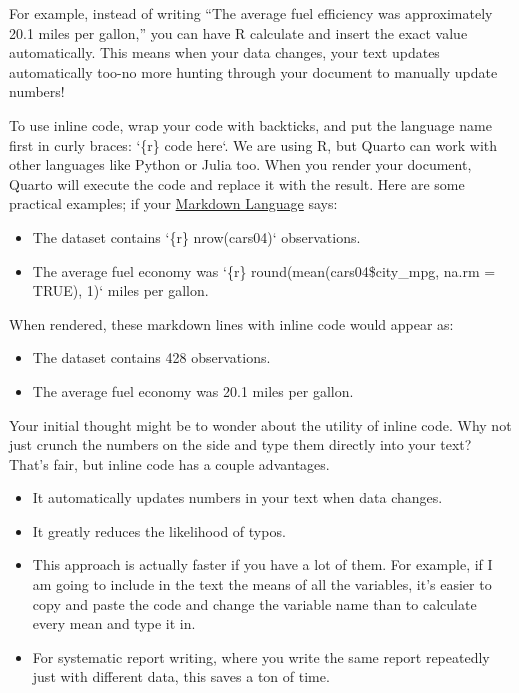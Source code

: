 \documentclass[
  letterpaper,
]{book}
\begin{document}
For example, instead of writing ``The average fuel efficiency was
approximately 20.1 miles per gallon,'' you can have R calculate and
insert the exact value automatically. This means when your data changes,
your text updates automatically too-no more hunting through your
document to manually update numbers!

To use inline code, wrap your code with backticks, and put the language
name first in curly braces: `\{r\} code here`. We are using R, but
Quarto can work with other languages like Python or Julia too. When you
render your document, Quarto will execute the code and replace it with
the result. Here are some practical examples; if your
\hyperref[markdown-language]{Markdown Language} says:

\begin{itemize}
\item
  The dataset contains `\{r\} nrow(cars04)` observations.
\item
  The average fuel economy was `\{r\} round(mean(cars04\$city\_mpg,
  na.rm = TRUE), 1)` miles per gallon.
\end{itemize}

When rendered, these markdown lines with inline code would appear as:

\begin{itemize}
\item
  The dataset contains 428 observations.
\item
  The average fuel economy was 20.1 miles per gallon.
\end{itemize}

Your initial thought might be to wonder about the utility of inline
code. Why not just crunch the numbers on the side and type them directly
into your text? That's fair, but inline code has a couple advantages.

\begin{itemize}
\item
  It automatically updates numbers in your text when data changes.
\item
  It greatly reduces the likelihood of typos.
\item
  This approach is actually faster if you have a lot of them. For
  example, if I am going to include in the text the means of all the
  variables, it's easier to copy and paste the code and change the
  variable name than to calculate every mean and type it in.
\item
  For systematic report writing, where you write the same report
  repeatedly just with different data, this saves a ton of time.
\end{itemize}
\end{document}
